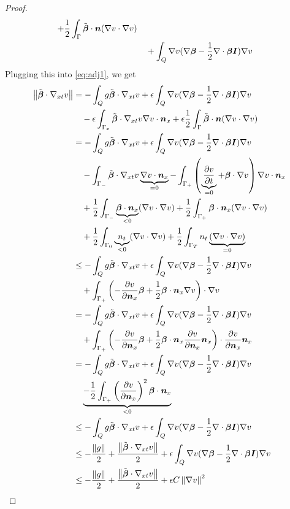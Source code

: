 \documentclass{article}
\begin{document}
\begin{proof}
\begin{align*}
+\frac{1}{2}\int_\Gamma\tilde{\boldsymbol\beta}\cdot\boldsymbol n(\nabla v\cdot\nabla v)\\
&\quad+\int_Q\nabla v(\nabla\boldsymbol\beta-\frac{1}{2}\nabla\cdot\boldsymbol\beta\boldsymbol I)\nabla v\\
\end{align*}
Plugging this into \eqref{eq:adj1}, we get
\begin{align*}
\norm{\tilde\bfbeta\cdot\Gradxt v}
&=-\int_Q g\tilde\bfbeta\cdot\Gradxt v
+\epsilon\int_Q\Grad v(\Grad\bfbeta-\frac{1}{2}\Div\bfbeta\bfI)\Grad v\\
&\quad-\epsilon\int_{\Gamma_x}\tilde\bfbeta\cdot\Gradxt v\Grad v\cdot\bfn_x
+\epsilon\frac{1}{2}\int_\Gamma\tilde\bfbeta\cdot\bfn(\Grad v\cdot\Grad v)\\
%
&=-\int_Q g\tilde\bfbeta\cdot\Gradxt v
+\epsilon\int_Q\Grad v(\Grad\bfbeta-\frac{1}{2}\Div\bfbeta\bfI)\Grad v\\
&\quad
-\int_{\Gamma_-}\tilde\bfbeta\cdot\Gradxt v\underbrace{\Grad v\cdot\bfn_x}_{=0}
-\int_{\Gamma_+}\LRp{\underbrace{\pd{v}{t}}_{=0}+\bfbeta\cdot\Grad v}\Grad v\cdot\bfn_x\\
&\quad
+\frac{1}{2}\int_{\Gamma_-}\underbrace{\bfbeta\cdot\bfn_x}_{<0}(\Grad v\cdot\Grad v)
+\frac{1}{2}\int_{\Gamma_+}\bfbeta\cdot\bfn_x(\Grad v\cdot\Grad v)\\
&\quad
+\frac{1}{2}\int_{\Gamma_0}\underbrace{n_t}_{<0}(\Grad v\cdot\Grad v)
+\frac{1}{2}\int_{\Gamma_T}n_t\underbrace{(\Grad v\cdot\Grad v)}_{=0}\\
%
&\leq-\int_Q g\tilde\bfbeta\cdot\Gradxt v
+\epsilon\int_Q\Grad v(\Grad\bfbeta-\frac{1}{2}\Div\bfbeta\bfI)\Grad v\\
&\quad
+\int_{\Gamma_+}\LRp{-\pd{v}{\bfn_x}\bfbeta
+\frac{1}{2}\bfbeta\cdot\bfn_x\Grad v}\cdot\Grad v\\
%
&=-\int_Q g\tilde\bfbeta\cdot\Gradxt v
+\epsilon\int_Q\Grad v(\Grad\bfbeta-\frac{1}{2}\Div\bfbeta\bfI)\Grad v\\
&\quad
+\int_{\Gamma_+}\LRp{-\pd{v}{\bfn_x}\bfbeta
+\frac{1}{2}\bfbeta\cdot\bfn_x\pd{v}{\bfn_x}\bfn_x}\cdot\pd{v}{\bfn_x}\bfn_x\\
%
&=-\int_Q g\tilde\bfbeta\cdot\Gradxt v
+\epsilon\int_Q\Grad v(\Grad\bfbeta-\frac{1}{2}\Div\bfbeta\bfI)\Grad v\\
&\quad
\underbrace{-\frac{1}{2}\int_{\Gamma_+}\LRp{\pd{v}{\bfn_x}}^2\bfbeta\cdot\bfn_x}_{<0}\\
%
&\leq-\int_Q g\tilde\bfbeta\cdot\Gradxt v
+\epsilon\int_Q\Grad v(\Grad\bfbeta-\frac{1}{2}\Div\bfbeta\bfI)\Grad v\\
%
&\leq-\frac{\norm{g}}{2}+\frac{\norm{\tilde\bfbeta\cdot\Gradxt v}}{2}
+\epsilon\int_Q\Grad v(\Grad\bfbeta-\frac{1}{2}\Div\bfbeta\bfI)\Grad v\\
%
&\leq-\frac{\norm{g}}{2}+\frac{\norm{\tilde\bfbeta\cdot\Gradxt v}}{2}
+\epsilon C\norm{\Grad v}^2
\end{align*}
\end{proof}
\end{document}
